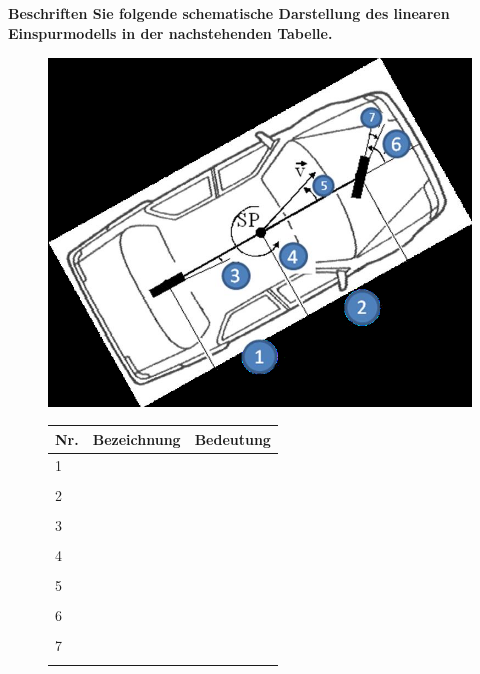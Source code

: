 \subsection{}
\textbf{Beschriften Sie folgende schematische Darstellung des linearen Einspurmodells in der nachstehenden Tabelle.}

\begin{figure}[H]
    \centering
    \begin{minipage}[c]{.45\linewidth}
        \centering
        \includegraphics[width=\linewidth]{Graphics/Linearen_Einspurmodell.png}
    \end{minipage}
    \begin{minipage}[c]{.45\linewidth}
        \centering
        \begin{tabular}{|p{.05\linewidth}|p{.2\linewidth}|p{.6\linewidth}|}
            \hline
            Nr. & Bezeichnung & Bedeutung \\
            \hline
            1   &             &           \\
            &&\\
            \hline
            2   &             &           \\
            &&\\
            \hline
            3   &             &           \\
            &&\\
            \hline
            4   &             &           \\
            &&\\
            \hline
            5   &             &           \\
            &&\\
            \hline
            6   &             &           \\
            &&\\
            \hline
            7   &             &           \\
            &&\\
            \hline
        \end{tabular}
    \end{minipage}
\end{figure}
